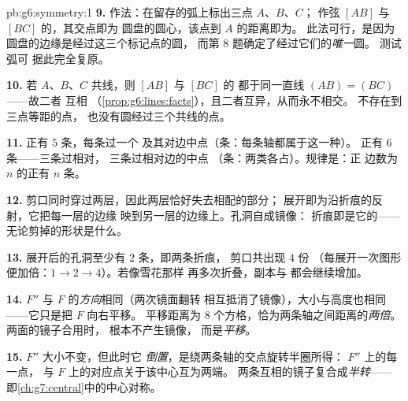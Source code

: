 \begin{solution}{pb:g6:symmetry:1}
\textbf{9.} 作法：在留存的弧上标出三点 $A$、$B$、$C$；
作弦 $[AB]$ 与 $[BC]$ 的，其交点即为
圆盘的圆心，该点到 $A$ 的距离即为。
此法可行，是因为圆盘的边缘是经过这三个标记点的圆，
而第 8 题确定了经过它们的\emph{唯一}圆。
测试弧可
据此完全复原。

\textbf{10.} 若 $A$、$B$、$C$ 共线，则 $[AB]$ 与 $[BC]$ 的
都于同一直线 $(AB) = (BC)$——故二者
互相
（\cref{prop:g6:lines:facts}），且二者互异，从而永不相交。
不存在到三点等距的点，
也没有圆经过三个共线的点。

\textbf{11.} 正有 $5$ 条，每条过一个
及其对边中点（条：每条轴都属于这一种）。
正有 $6$ 条——三条过相对，
三条过相对边的中点
（条：两类各占）。规律是：正
边数为 $n$ 的正有 $n$ 条。

\textbf{12.} 剪口同时穿过两层，因此两层恰好失去相配的部分；
展开即为沿折痕的反射，它把每一层的边缘
映到另一层的边缘上。孔洞自成镜像：
折痕即是它的——
无论剪掉的形状是什么。

\textbf{13.} 展开后的孔洞至少有 $2$ 条，即两条折痕，
剪口共出现 $4$ 份
（每展开一次图形便加倍：$1 \to 2 \to 4$）。若像雪花那样
再多次折叠，副本与
都会继续增加。

\textbf{14.} $F''$ 与 $F$ 的\emph{方向}相同（两次镜面翻转
相互抵消了镜像），大小与高度也相同——它只是把 $F$ 向右平移。
平移距离为 $8$ 个方格，恰为两条轴之间距离的\emph{两倍}。
两面的镜子合用时，
根本不产生镜像，
而是\emph{平移}。

\textbf{15.} $F''$ 大小不变，但此时它
\emph{倒置}，是绕两条轴的交点旋转半圈所得：
$F''$ 上的每一点，
与 $F$ 上的对应点关于该中心互为两端。
两条互相的镜子复合成\emph{半转}——
即\cref{ch:g7:central}中的中心对称。
\end{solution}
